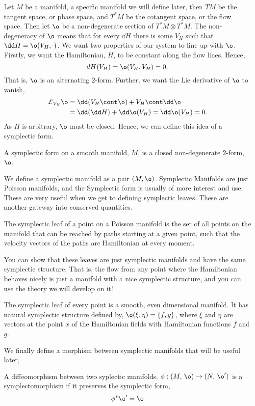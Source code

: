 \noindent
Let $M$ be a manifold, a specific manifold we will define later, then $TM$ be the tangent space, or phase space, and $T^*M$ be the cotangent space, or the flow space. Then let $\o$ be a non-degenerate section of $T^*M \otimes T^*M$. The non-degeneracy of $\o$ means that for every $\dd H$ there is some $V_H$ such that $\dd H = \o (V_H, \cdot)$. We want two properties of our system to line up with $\o$. Firstly, we want the Hamiltonian, $H$, to be constant along the flow lines. Hence,
$$ dH(V_H) = \o (V_H, V_H) = 0. $$
That is, $\o$ is an alternating 2-form. Further, we want the Lie derivative of $\o$ to vanish,
\begin{align*}
  \pounds_{V_H} \o &= \dd (V_H \cont \o) + V_H \cont \dd \o \\
  &= \dd (\dd H) + \dd \o(V_H) = \dd \o (V_H) = 0.
\end{align*}
As $H$ is arbitrary, $\o$ must be closed. Hence, we can define this idea of a symplectic form.
\begin{ndefi}
  A symplectic form on a smooth manifold, $M$, is a closed non-degenerate 2-form, $\o$.
\end{ndefi}
\noindent
We define a symplectic manifold as a pair $(M, \o)$. Symplectic Manifolds are just Poisson manifolds, and the Symplectic form is usually of more interest and use. These are very useful when we get to defining symplectic leaves. These are another gateway into conserved quantities.
\begin{ndefi}
  The symplectic leaf of a point on a Poisson manifold is the set of all points on the manifold that can be reached by paths starting at a given point, such that the velocity vectors of the paths are Hamiltonian at every moment.
\end{ndefi}
\noindent
You can show that these leaves are just symplectic manifolds and have the same symplectic structure. That is, the flow from any point where the Hamiltonian behaves nicely is just a manifold with a nice symplectic structure, and you can use the theory we will develop on it!
\begin{nthm}[]
  The symplectic leaf of every point is a smooth, even dimensional manifold. It has natural symplectic structure defined by, $\o(\xi, \eta) = \{f, g\}$, where $\xi$ and $\eta$ are vectors at the point $x$ of the Hamiltonian fields with Hamiltonian functions $f$ and $g$.
\end{nthm}
\noindent
We finally define a morphism between symplectic manifolds that will be useful later,
\begin{ndefi}[Symplectomorphism]
  A diffeomorphism between two syplectic manifolds, $\phi : (M,\, \o) \to (N,\, \o')$ is a symplectomorphism if it preserves the symplectic form,
  $$ \phi^* \o' = \o $$
\end{ndefi}